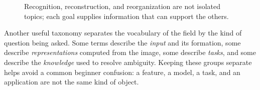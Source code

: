\begin{figure}[ht]
  \centering
  \caption{Recognition, reconstruction, and reorganization are not isolated
  topics; each goal supplies information that can support the others.}
\end{figure}

\noindent
Another useful taxonomy separates the vocabulary of the field by the kind of
question being asked. Some terms describe the \emph{input} and its formation,
some describe \emph{representations} computed from the image, some describe
\emph{tasks}, and some describe the \emph{knowledge} used to resolve ambiguity.
Keeping these groups separate helps avoid a common beginner confusion: a feature,
a model, a task, and an application are not the same kind of object.

